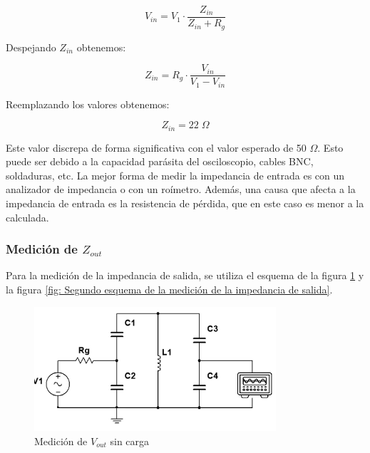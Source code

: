 \begin{equation}
    V_{in} = V_1 \cdot \frac{Z_{in}}{Z_{in} + R_{g}}
\end{equation}

Despejando $Z_{in}$ obtenemos:

\begin{equation}
    Z_{in} = R_g \cdot \frac{ V_{in}}{V_1 - V_{in}}
\end{equation}

Reemplazando los valores obtenemos:

\begin{equation}
    \boxed{Z_{in} = 22\; \Omega}
\end{equation}

Este valor discrepa de forma significativa con el valor esperado de 50 $\Omega$. Esto puede ser debido a la capacidad parásita del osciloscopio, cables BNC, soldaduras, etc. 
La mejor forma de medir la impedancia de entrada es con un analizador de impedancia o con un roímetro. 
Además, una causa que afecta a la impedancia de entrada es la resistencia de pérdida, que en este caso es menor a la calculada.

\subsubsection{Medición de $Z_{out}$}

Para la medición de la impedancia de salida, se utiliza el esquema de la figura \ref{fig: Primer esquema de la medición de la impedancia de salida} y la figura
\ref{fig: Segundo esquema de la medición de la impedancia de salida}.

%
\begin{figure}[h]
    \centering
    \includegraphics[width=0.8\textwidth]{Imagenes/medicion_zout1.png}
    \caption{Medición de $V_{out}$ sin carga}
    \label{fig: Primer esquema de la medición de la impedancia de salida}
\end{figure}

